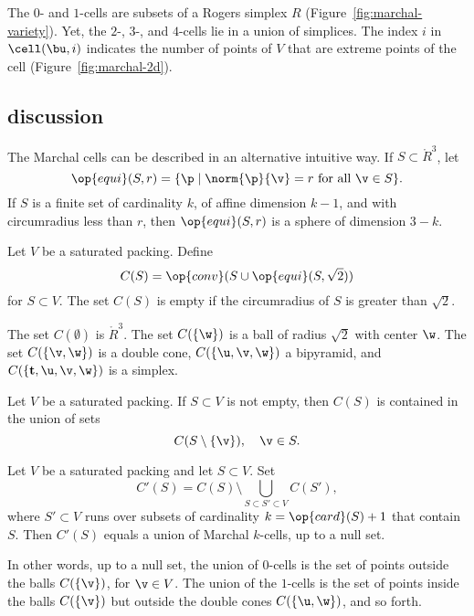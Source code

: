 %

\figKVIVUOT %

The $0$- and $1$-cells are  subsets of a Rogers  simplex
$R$ (Figure~\ref{fig:marchal-variety}).  
Yet, the $2$-, $3$-, and $4$-cells lie in a union of
simplices.  The index $i$ in  $\cell(\bu,i)$ indicates the number
of points of $V$ that are extreme points of the cell (Figure~\ref{fig:marchal-2d}). 

\figBWEYURN %

\subsection{discussion}

The Marchal cells can be described in an alternative intuitive way.
If $S\subset\ring{R}^3$, let
\[
\op{equi}(S,r) = \{ \p \mid \norm{\p}{\v} = r \text{ for all } \v \in S \}.
\]
If $S$ is a finite set of cardinality $k$, of affine dimension $k-1$, and
with circumradius less than $r$, then
$\op{equi}(S,r)$ is a sphere of dimension $3-k$.


Let $V$ be a saturated packing.  Define
\[
C(S) = \op{conv} (S\cup\op{equi}(S, \sqrt2) )
\]
for $S\subset V$.  The set $C(S)$ is empty if the circumradius of $S$
is greater than $\sqrt2$.

The set $C(\emptyset)$ is $\ring{R}^3$.  The set $C(\{\w\})$ is a ball
of radius $\sqrt2$ with center $\w$.  The set $C(\{\v,\w\})$ is a
double cone, $C(\{\u,\v,\w\})$ a bipyramid, and $C(\{{\mathbf
  t},\u,\v,\w\})$ is a simplex.

\begin{lemma}
Let $V$ be a saturated packing.
If $S\subset V$ is not empty, then $C(S)$ is contained in the union of sets
\[
C(S\setminus \{\v\}),  \quad \v\in S.
\]
\end{lemma}

\begin{lemma}
Let $V$ be a saturated packing and let $S\subset V$. 
Set
\[C'(S) = C(S) \setminus \bigcup_{S\subset S'\subset V} C(S'),\] where
$S'\subset V$ runs over subsets of cardinality $k=\op{card}(S)+1$ that
contain $S$.  Then $C'(S)$ equals a union of Marchal $k$-cells,
up to a null set.
\end{lemma}

In other words, up to a null set, the union of $0$-cells is the set of points
outside the balls $C(\{\v\})$, for $\v\in V$.  The union of the $1$-cells
is the set of points inside the balls $C(\{\v\})$ but outside the double cones
$C(\{\u,\w\})$, and so forth.

